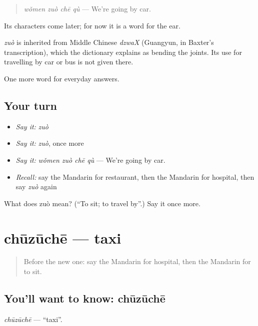 \begin{quote}
\emph{wǒmen zuò chē qù} — We're going by car.
\end{quote}

Its characters come later; for now it is a word for the ear.

\begin{cousinweb}
\emph{zuò} is inherited from Middle Chinese \emph{dzwaX} (Guangyun, in Baxter's transcription), which the dictionary explains as bending the joints. Its use for travelling by car or bus is not given there.
\end{cousinweb}

\begin{grammarlens}[title={What you've built}]
One more word for everyday answers.
\end{grammarlens}

\subsection*{Your turn}
\begin{itemize}
\raggedright
  \item \emph{Say it:} \emph{zuò}
  \item \emph{Say it:} \emph{zuò}, once more
  \item \emph{Say it:} \emph{wǒmen zuò chē qù} — We're going by car.
  \item \emph{Recall:} say the Mandarin for restaurant, then the Mandarin for hospital, then say \emph{zuò} again
\end{itemize}

\begin{tcolorbox}[breakable,colback=teal!4,colframe=teal!35!black,title={Before you move on}]
What does zuò mean? (\textquotedblleft{}To sit; to travel by\textquotedblright{}.) Say it once more.
\end{tcolorbox}
\section[chūzūchē]{chūzūchē — taxi}

\label{lesson:ZH-C44-chuzuche}



\begin{quote}
Before the new one: say the Mandarin for hospital, then the Mandarin for to sit.
\end{quote}

\subsection*{You'll want to know: chūzūchē}
\emph{chūzūchē} — \textquotedblleft{}taxi\textquotedblright{}.

